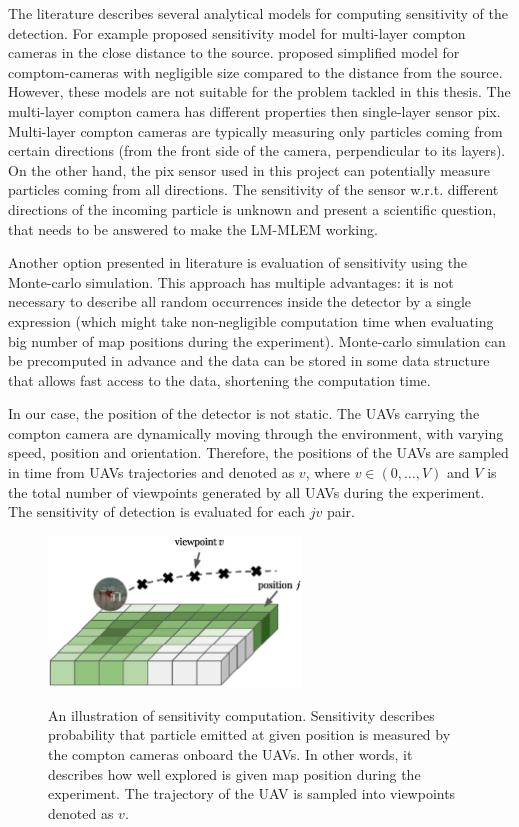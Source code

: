 The literature describes several analytical models for computing sensitivity of the detection. 
For example \cite{wilderman2001} proposed sensitivity model for multi-layer compton cameras in the close distance to the source.
\cite{maxim2016} proposed simplified model for comptom-cameras with negligible size compared to the distance from the source.
However, these models are not suitable for the problem tackled in this thesis.
The multi-layer compton camera has different properties then single-layer sensor \ac{pix}.
Multi-layer compton cameras are typically measuring only particles coming from certain directions (from the front side of the camera, perpendicular to its layers).
On the other hand, the \ac{pix} sensor used in this project can potentially measure particles coming from all directions.
The sensitivity of the sensor w.r.t. different directions of the incoming particle is unknown and present a scientific question, that needs to be answered to make the \ac{LM-MLEM} working. 

Another option presented in literature is evaluation of sensitivity using the Monte-carlo simulation.
This approach has multiple advantages: it is not necessary to describe all random occurrences inside the detector by a single expression (which might take non-negligible computation time when evaluating big number of map positions during the experiment).
Monte-carlo simulation can be precomputed in advance and the data can be stored in some data structure that allows fast access to the data, shortening the computation time.

In our case, the position of the detector is not static. 
The \ac{UAV}s carrying the compton camera are dynamically moving through the environment, with varying speed, position and orientation.
Therefore, the positions of the \ac{UAV}s are sampled in time from \ac{UAV}s trajectories and denoted as $v$, where $v \in (0, \dots , V)$ and $V$ is the total number of viewpoints generated by all \ac{UAV}s during the experiment.
The sensitivity of detection is evaluated for each $jv$ pair. %
\begin{figure}[!h]
  \centering
    \includegraphics[width=0.6\textwidth]{./fig/photos/sen.eps}
    \label{fig:sen_illustration}
  \caption{An illustration of sensitivity computation. Sensitivity describes probability that particle emitted at given position is measured by the compton cameras onboard the \ac{UAV}s. In other words, it describes how well explored is given map position during the experiment. The trajectory of the \ac{UAV} is sampled into viewpoints denoted as $v$.}
\end{figure}%

